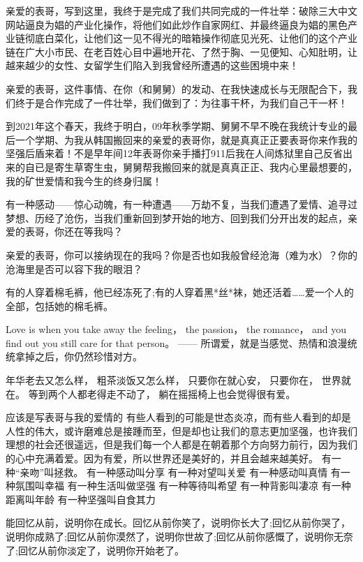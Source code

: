 \documentclass[9pt, b5paper]{article}
\begin{document}
亲爱的表哥，写到这里，我终于是完成了我们共同完成的一件壮举：破除三大中文网站逼良为娼的产业化操作，将他们如此炒作自家网红、并最终逼良为娼的黑色产业链彻底白菜化，让他们这一见不得光的暗箱操作彻底见光死、让他们的这个产业链在广大小市民、在老百姓心目中遍地开花、了然于胸、一见便知、心知肚明，让越来越少的女性、女留学生们陷入到我曾经所遭遇的这些困境中来！

亲爱的表哥，这件事情、在你（和舅舅）的发动、在我快速成长与无限配合下，我们终于是合作完成了一件壮举，我们做到了：为往事干杯，为我们自己干一杯！

到2021年这个春天，我终于明白，09年秋季学期、舅舅不早不晚在我统计专业的最后一个学期、为我从韩国搬回来的亲爱的表哥你，就是真真正正要表哥你来作我的坚强后盾来着！不是早年间12年表哥你亲手播打911后我在人间炼狱里自己反省出来的自已是寄生草寄生虫，舅舅帮我搬回来的就是真真正正、我内心里最想要的，我的矿世爱情和我今生的终身归属！

有一种感动——惊心动魄，有一种遭遇——万劫不复，当我们遭遇了爱情、追寻过梦想、历经了沧伤，当我们重新回到梦开始的地方、回到我们分开出发的起点，亲爱的表哥，你还在等我吗？

亲爱的表哥，你可以接纳现在的我吗？你是否也如我般曾经沧海（难为水）？你的沧海里是否可以容下我的眼泪？

有的人穿着棉毛裤，他已经冻死了;有的人穿着黑*丝*袜，她还活着……爱一个人的全部，包括她的棉毛裤。

Love is when you take away the feeling， the passion， the romance， and you find out you still care for that person。 —— 所谓爱，就是当感觉、热情和浪漫统统拿掉之后，你仍然珍惜对方。

年华老去又怎么样， 粗茶淡饭又怎么样， 只要你在就心安， 只要你在， 世界就在。 等到两个人都老得走不动了， 躺在摇摇椅上也会觉得很有爱。

应该是写表哥与我的爱情的
有些人看到的可能是世态炎凉，而有些人看到的却是人性的伟大，或许磨难总是接踵而至，但是却也让我们的意志更加坚强，也许我们理想的社会还很遥远，但是我们每一个人都是在朝着那个方向努力前行，因为我们的心中充满着爱。因为有爱，所以世界还是美好的，并且会越来越美好。 
有一种“亲吻”叫拯救。
有一种感动叫分享
有一种对望叫关爱
有一种感动叫真情
有一种氛围叫幸福
有一种生活叫做坚强
有一种等待叫希望
有一种背影叫凄凉
有一种距离叫年龄
有一种坚强叫自食其力

能回忆从前，说明你在成长。回忆从前你笑了，说明你长大了;回忆从前你哭了，说明你成熟了;回忆从前你漠然了，说明你世故了;回忆从前你感慨了，说明你无奈了;回忆从前你淡定了，说明你开始老了。
\end{document}
